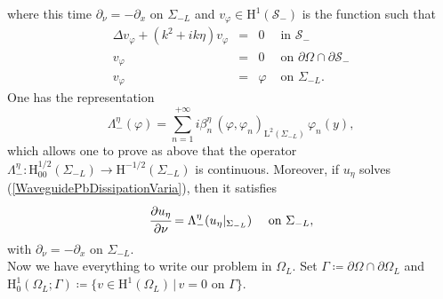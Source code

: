 \documentclass[11pt,a4paper]{report}
\newcommand{\dsp}{\displaystyle}
\newcommand{\Om}{\Omega}
\newcommand{\mrm}[1]{\mathrm{#1}}
\newcommand{\mL}{\mrm{L}}
\newcommand{\mH}{\mrm{H}}
\begin{document}
where this time $\partial_\nu=-\partial_x$ on $\Sigma_{-L}$ and $v_{\varphi}\in \mH^1(\mathcal{S}_-)$ is the function such that
\[
\begin{array}{|rcll}
\Delta v_{\varphi}+(k^2+ik\eta)v_{\varphi}&=&0&\mbox{ in }\mathcal{S}_- \\[2pt]
v_{\varphi}&=&0&\mbox{ on }\partial\Om\cap\partial \mathcal{S}_-\\[2pt]
v_{\varphi}&=&\varphi&\mbox{ on }\Sigma_{-L}.
\end{array}
\]
One has the representation 
\[
\Lambda_-^\eta(\varphi)=\dsp\sum_{n=1}^{+\infty} i\beta_n^\eta\,(\varphi,\varphi_n)_{\mL^2(\Sigma_{-L})}\,\varphi_n(y),
\]
which allows one to prove as above that the operator $\Lambda_-^\eta:\mH^{1/2}_{00}(\Sigma_{-L})  \to \mH^{-1/2}(\Sigma_{-L})$  is continuous. Moreover, if $u_\eta$ solves (\ref{WaveguidePbDissipationVaria}), then it satisfies
\begin{equation}\label{CondTransM}
\cfrac{\partial u_\eta}{\partial \nu} =\Lambda_-^\eta( u_\eta|_{\Sigma_{-L}})\quad\mbox{ on }\Sigma_{-L},
\end{equation}
with $\partial_\nu=-\partial_x$ on $\Sigma_{-L}$.\\
\newline
Now we have everything to write our problem in $\Om_L$. Set $\Gamma\coloneqq\partial\Om\cap\partial\Om_L$ and $\mH^1_0(\Om_L;\Gamma)\coloneqq\{v\in\mH^1(\Om_L)\,|\,v=0\mbox{ on }\Gamma\}$. 
\end{document}
